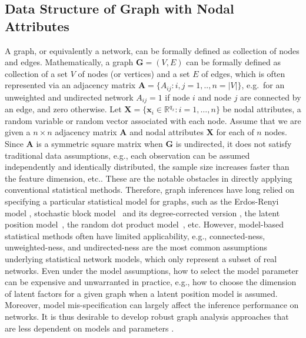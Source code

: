 \documentclass[11pt]{article}
\theoremstyle{definition}
\begin{document}
	\subsection{Data Structure of Graph with Nodal Attributes}
	A graph, or equivalently a network, can be formally defined as collection of nodes and edges.
	Mathematically, a graph $\mathbf{G}=(V,E)$ can be formally defined as collection of a set $V$ of nodes (or vertices) and a set $E$ of edges, which is often represented via an adjacency matrix $\mathbf{A} = \{A_{ij} : i,j= 1,..,n = |V| \}$, e.g.~for an unweighted and undirected network $A_{ij} = 1$ if node $i$ and node $j$ are connected by an edge, and zero otherwise. Let $\mathbf{X} = \{  \mathbf{x}_{i} \in \mathbb{R}^{q_{x}} : i = 1, \ldots, n \}$ be nodal attributes, a random variable or random vector associated with each node. Assume that we are given a $n \times n$ adjacency matrix $\mathbf{A}$ and nodal attributes $\mathbf{X}$ for each of $n$ nodes. Since $\mathbf{A}$ is a symmetric square matrix when $\mathbf{G}$ is undirected, it does not satisfy traditional data assumptions, e.g., each observation can be assumed independently and identically distributed, the sample size increases faster than the feature dimension, etc.. These are the notable obstacles in directly applying conventional statistical methods. Therefore, graph inferences have long relied on specifying a particular statistical model for graphs, such as the Erdos-Renyi model \cite{erdosrenyi1959,Gilbert1959}, stochastic block model~\cite{HollandEtAl1983, rohe2011spectral,SussmanEtAl2012,Lei2015} and its degree-corrected version \cite{karrer2011stochastic, ZhaoLevinaZhu2012}, the latent position model~\cite{TangSussmanPriebe2013,fosdick2015testing}, the random dot product model~\cite{YoungScheinerman2007, sussman2014consistent}, etc. However, model-based statistical methods often have limited applicability, e.g., connected-ness, unweighted-ness, and undirected-ness are the most common assumptions underlying statistical network models, which only represent a subset of real networks. Even under the model assumptions, how to select the model parameter can be expensive and unwarranted in practice, e.g., how to choose the dimension of latent factors for a given graph when a latent position model is assumed. Moreover, model mis-specification can largely affect the inference performance on networks. It is thus desirable to develop robust graph analysis approaches that are less dependent on models and parameters \cite{ChenShenVogelsteinPriebe2016}.
	
\end{document}
